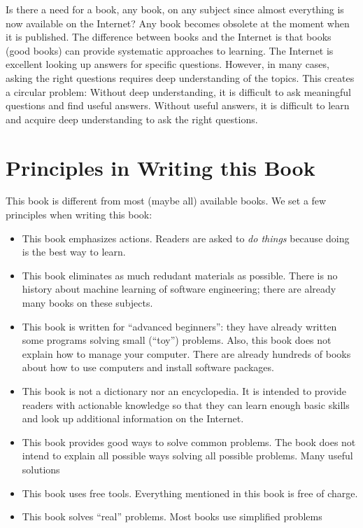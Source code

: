 Is there a need for a book, any book, on any subject since almost
everything is now available on the Internet?  Any book becomes
obsolete at the moment when it is published.  The difference between
books and the Internet is that books (good books) can provide
systematic approaches to learning. The Internet is excellent looking
up answers for specific questions. However, in many cases, asking the
right questions requires deep understanding of the topics.  This
creates a circular problem: Without deep understanding, it is
difficult to ask meaningful questions and find useful answers. Without
useful answers, it is difficult to learn and acquire deep
understanding to ask the right questions.

\section*{Principles in Writing this Book}

This book is different from most (maybe all) available books.
We set a few principles when writing this book:

\begin{itemize}
\item This book emphasizes actions. Readers are asked to {\it do
  things} because doing is the best way to learn.

\item This book eliminates as much redudant materials as
  possible.  There is no history about machine learning
  of software engineering; there are already many books
  on these subjects.

\item This book is written for ``advanced beginners'': they have
  already written some programs solving small (``toy'')
  problems. Also, this book does not explain how to manage your
  computer.  There are already hundreds of books about
  how to use computers and install software packages.

\item This book is not a dictionary nor an encyclopedia.
  It is intended to provide readers with actionable
  knowledge so that they can learn enough basic skills
  and look up additional information on the Internet.

\item This book provides good ways to solve common problems.
  The book does not intend to explain all possible ways
  solving all possible problems. Many useful solutions

\item This book uses free tools. Everything mentioned in
  this book is free of charge.

\item This book solves ``real'' problems.  Most books
  use simplified problems 
  
\end{itemize}  



